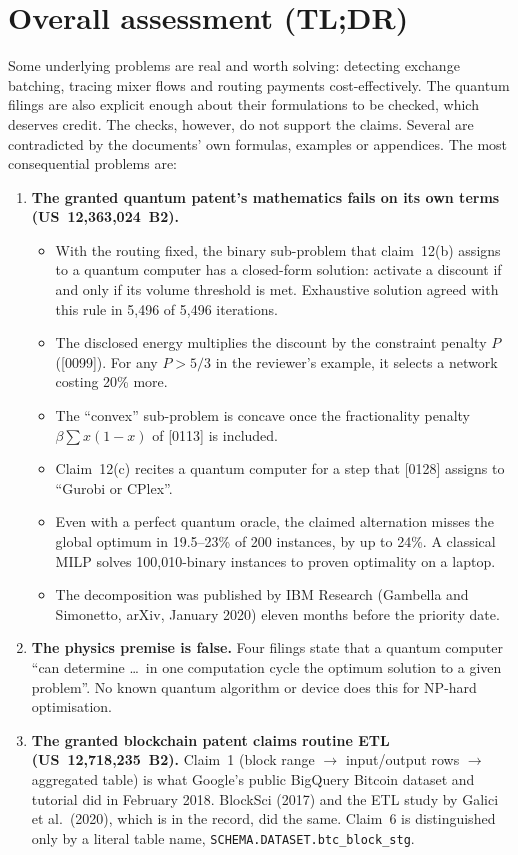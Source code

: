 \documentclass[10pt,a4paper]{article}
\begin{document}
\section*{Overall assessment (TL;DR)}
Some underlying problems are real and worth solving: detecting exchange batching, tracing mixer flows and routing payments cost-effectively. The quantum filings are also explicit enough about their formulations to be checked, which deserves credit. The checks, however, do not support the claims. Several are contradicted by the documents' own formulas, examples or appendices. The most consequential problems are:
\begin{enumerate}[label=\textbf{\arabic*.}]
  \item \textbf{The granted quantum patent's mathematics fails on its own terms (US~12,363,024~B2).}
  \begin{itemize}
    \item With the routing fixed, the binary sub-problem that claim~12(b) assigns to a quantum computer has a closed-form solution: activate a discount if and only if its volume threshold is met. Exhaustive solution agreed with this rule in 5,496 of 5,496 iterations.
    \item The disclosed energy multiplies the discount by the constraint penalty $P$ ([0099]). For any $P>5/3$ in the reviewer's example, it selects a network costing 20\% more.
    \item The ``convex'' sub-problem is concave once the fractionality penalty $\beta\sum x(1-x)$ of [0113] is included.
    \item Claim~12(c) recites a quantum computer for a step that [0128] assigns to ``Gurobi or CPlex''.
    \item Even with a perfect quantum oracle, the claimed alternation misses the global optimum in 19.5--23\% of 200 instances, by up to 24\%. A classical MILP solves 100,010-binary instances to proven optimality on a laptop.
    \item The decomposition was published by IBM Research (Gambella and Simonetto, arXiv, January 2020) eleven months before the priority date.
  \end{itemize}
  \item \textbf{The physics premise is false.} Four filings state that a quantum computer ``can determine \ldots\ in one computation cycle the optimum solution to a given problem''. No known quantum algorithm or device does this for NP-hard optimisation.
  \item \textbf{The granted blockchain patent claims routine ETL (US~12,718,235~B2).} Claim~1 (block range $\rightarrow$ input/output rows $\rightarrow$ aggregated table) is what Google's public BigQuery Bitcoin dataset and tutorial did in February 2018. BlockSci (2017) and the ETL study by Galici et al.\ (2020), which is in the record, did the same. Claim~6 is distinguished only by a literal table name, \texttt{SCHEMA.DATASET.btc\_block\_stg}.

\end{enumerate}
\end{document}
